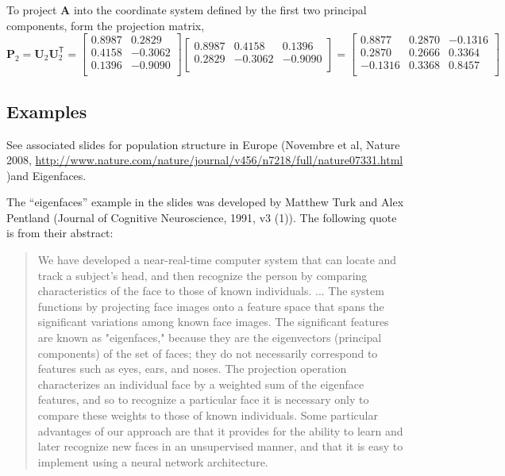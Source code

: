 To project   $\mathbf A$ into the  coordinate system defined by the first two principal components, form the projection matrix, \[\mathbf P_2  =  \mathbf{U}_2\mathbf{U}_2^\mathsf{T} = \left[ 
\begin{array}{rrr}
 0.8987 & 0.2829  \\
 0.4158 &-0.3062  \\
 0.1396 & -0.9090 \\
\end{array} \right] \left[ 
\begin{array}{rrr}
 0.8987 & 0.4158 &  0.1396 \\ 
 0.2829  & -0.3062 & -0.9090 \\
\end{array} \right]  =
\left[ 
\begin{array}{rrr}
  0.8877 &0.2870 &-0.1316 \\
  0.2870& 0.2666 & 0.3364\\
 -0.1316& 0.3368 & 0.8457\\
\end{array} \right] 
\]


\subsection{Examples}
\label{sec:svdexamples}
See associated slides for population structure in Europe (Novembre et al, Nature 2008, \url{http://www.nature.com/nature/journal/v456/n7218/full/nature07331.html} )and Eigenfaces.

The ``eigenfaces'' example in the slides was developed by Matthew Turk and Alex Pentland (Journal of Cognitive Neuroscience, 1991, v3 (1)). The following quote is from their abstract:
\begin{quote}
We have developed a near-real-time computer system that can locate and track a subject's head, and then recognize the person by comparing characteristics of the face to those of known individuals. ... The system functions by projecting face images onto a feature space that spans the significant variations among known face images. The significant features are known as "eigenfaces," because they are the eigenvectors (principal components) of the set of faces; they do not necessarily correspond to features such as eyes, ears, and noses. The projection operation characterizes an individual face by a weighted sum of the eigenface features, and so to recognize a particular face it is necessary only to compare these weights to those of known individuals. Some particular advantages of our approach are that it provides for the ability to learn and later recognize new faces in an unsupervised manner, and that it is easy to implement using a neural network architecture.
\end{quote}
% 

